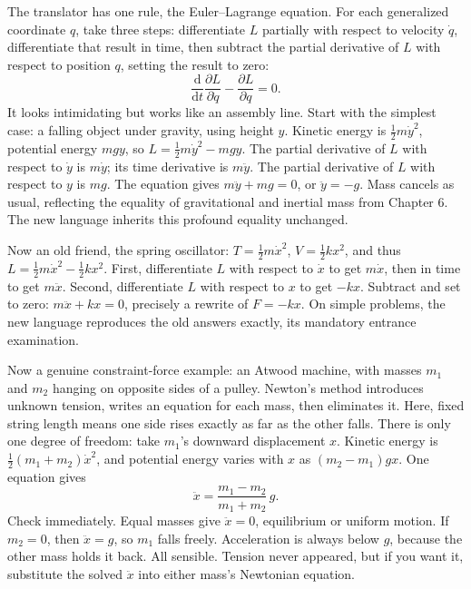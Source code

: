 \begin{mainline}
The translator has one rule, the Euler--Lagrange equation. For each generalized coordinate \(q\), take three steps: differentiate \(L\) partially with respect to velocity \(\dot{q}\), differentiate that result in time, then subtract the partial derivative of \(L\) with respect to position \(q\), setting the result to zero:
\[
\frac{\mathrm{d}}{\mathrm{d}t}\frac{\partial L}{\partial \dot{q}}-\frac{\partial L}{\partial q}=0 .
\]
It looks intimidating but works like an assembly line. Start with the simplest case: a falling object under gravity, using height \(y\). Kinetic energy is \(\frac{1}{2}m\dot{y}^2\), potential energy \(mgy\), so \(L=\frac{1}{2}m\dot{y}^2-mgy\). The partial derivative of \(L\) with respect to \(\dot{y}\) is \(m\dot{y}\); its time derivative is \(m\ddot{y}\). The partial derivative of \(L\) with respect to \(y\) is \(mg\). The equation gives \(m\ddot{y}+mg=0\), or \(\ddot{y}=-g\). Mass cancels as usual, reflecting the equality of gravitational and inertial mass from Chapter 6. The new language inherits this profound equality unchanged.

Now an old friend, the spring oscillator: \(T=\frac{1}{2}m\dot{x}^2\), \(V=\frac{1}{2}kx^2\), and thus \(L=\frac{1}{2}m\dot{x}^2-\frac{1}{2}kx^2\). First, differentiate \(L\) with respect to \(\dot{x}\) to get \(m\dot{x}\), then in time to get \(m\ddot{x}\). Second, differentiate \(L\) with respect to \(x\) to get \(-kx\). Subtract and set to zero: \(m\ddot{x}+kx=0\), precisely a rewrite of \(F=-kx\). On simple problems, the new language reproduces the old answers exactly, its mandatory entrance examination.

Now a genuine constraint-force example: an Atwood machine, with masses \(m_1\) and \(m_2\) hanging on opposite sides of a pulley. Newton's method introduces unknown tension, writes an equation for each mass, then eliminates it. Here, fixed string length means one side rises exactly as far as the other falls. There is only one degree of freedom: take \(m_1\)'s downward displacement \(x\). Kinetic energy is \(\frac{1}{2}(m_1+m_2)\dot{x}^2\), and potential energy varies with \(x\) as \((m_2-m_1)gx\). One equation gives
\[
\ddot{x}=\frac{m_1-m_2}{m_1+m_2}\,g .
\]
Check immediately. Equal masses give \(\ddot{x}=0\), equilibrium or uniform motion. If \(m_2=0\), then \(\ddot{x}=g\), so \(m_1\) falls freely. Acceleration is always below \(g\), because the other mass holds it back. All sensible. Tension never appeared, but if you want it, substitute the solved \(\ddot{x}\) into either mass's Newtonian equation.


\end{mainline}

